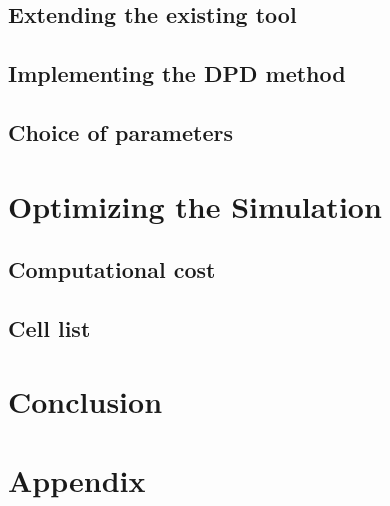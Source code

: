 \documentclass[]{usiinfbachelorproject}
\begin{document}
\subsection{Extending the existing tool}
\subsection{Implementing the DPD method}
\subsection{Choice of parameters}

\newpage
\section{Optimizing the Simulation}
\subsection{Computational cost}
\subsection{Cell list}

\newpage
\section{Conclusion}

\newpage
\section{Appendix}

\newpage


\end{document}

